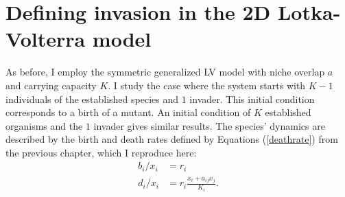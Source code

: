 \iffalse
Transient coexistence during the fixation/extinction process of immigrants/mutants has also been proposed as a mechanism for observed biodiversity in a number of contexts \cite{Kimura1964,Dias1996,Hubbell2001,Chesson2000,Leibold2006,Kessler2015,Vega2017}. 
The extent of this biodiversity is constrained by the interplay between the residence times of these invaders and the rate at which they appear in a settled population. 
In the previous sections we calculated the fixation times in the two species system starting from the deterministically stable fixed point. 
In this section we investigate the complementary problem of robustness of a stable population of one species with respect to an invasion of another species, arising either through mutation or immigration, and investigate the effect of niche overlap and system size on the probability and mean times of successful and failed invasions. 
\fi


\section{Defining invasion in the 2D Lotka-Volterra model}

As before, I employ the symmetric generalized LV model with niche overlap $a$ and carrying capacity $K$. 
I study the case where the system starts with $K-1$ individuals of the established species and $1$ invader. 
This initial condition corresponds to a birth of a mutant. 
An initial condition of $K$ established organisms and the $1$ invader gives similar results. 
The species' dynamics are described by the birth and death rates defined by Equations (\ref{deathrate}) from the previous chapter, which I reproduce here:
\begin{align*}
	b_i/x_i &= r_i \\
	d_i/x_i &= r_i\frac{x_i+a_{ij}x_j}{K_i}. 
\end{align*}

